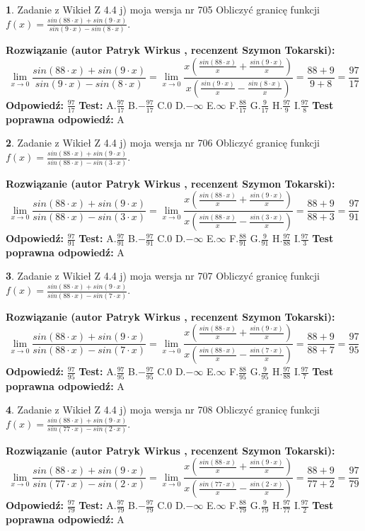 \documentclass[12pt, a4paper]{article}
\theoremstyle{definition} %
\newtheorem{zad}{}
\newcommand{\zadStart}[1]{\begin{zad}#1\newline}
\newcommand{\zadStop}{\end{zad}}
\newcommand{\rozwStart}[2]{\noindent \textbf{Rozwiązanie (autor #1 , recenzent #2): }\newline}
\newcommand{\rozwStop}{\newline}
\newcommand{\odpStart}{\noindent \textbf{Odpowiedź:}\newline}
\newcommand{\odpStop}{\newline}
\newcommand{\testStart}{\noindent \textbf{Test:}\newline}
\newcommand{\testStop}{\newline}
\newcommand{\kluczStart}{\noindent \textbf{Test poprawna odpowiedź:}\newline}
\newcommand{\kluczStop}{\newline}
\begin{document}
\zadStart{Zadanie z Wikieł Z 4.4 j) moja wersja nr 705}
Obliczyć granicę funkcji $f(x)=\frac{sin(88\cdot x) +sin(9\cdot x)}{sin(9\cdot x) -sin(8\cdot x)}$.
\zadStop
\rozwStart{Patryk Wirkus}{Szymon Tokarski}
$$\lim\limits_{x\to 0}\frac{sin(88\cdot x) +sin(9\cdot x)}{sin(9\cdot x) -sin(8\cdot x)}=\lim\limits_{x\to 0}\frac{x(\frac{sin(88\cdot x)}{x}+\frac{sin(9\cdot x)}{x})}{x(\frac{sin(9\cdot x)}{x}-\frac{sin(8\cdot x)}{x})}=\frac{88+9}{9+8} = \frac{97}{17}$$
\rozwStop
\odpStart
$\frac{97}{17}$
\odpStop
\testStart
A.$\frac{97}{17}$
B.$-\frac{97}{17}$
C.$0$
D.$-\infty$
E.$\infty$
F.$\frac{88}{17}$
G.$\frac{9}{17}$
H.$\frac{97}{9}$
I.$\frac{97}{8}$
\testStop
\kluczStart
A
\kluczStop



\zadStart{Zadanie z Wikieł Z 4.4 j) moja wersja nr 706}
Obliczyć granicę funkcji $f(x)=\frac{sin(88\cdot x) +sin(9\cdot x)}{sin(88\cdot x) -sin(3\cdot x)}$.
\zadStop
\rozwStart{Patryk Wirkus}{Szymon Tokarski}
$$\lim\limits_{x\to 0}\frac{sin(88\cdot x) +sin(9\cdot x)}{sin(88\cdot x) -sin(3\cdot x)}=\lim\limits_{x\to 0}\frac{x(\frac{sin(88\cdot x)}{x}+\frac{sin(9\cdot x)}{x})}{x(\frac{sin(88\cdot x)}{x}-\frac{sin(3\cdot x)}{x})}=\frac{88+9}{88+3} = \frac{97}{91}$$
\rozwStop
\odpStart
$\frac{97}{91}$
\odpStop
\testStart
A.$\frac{97}{91}$
B.$-\frac{97}{91}$
C.$0$
D.$-\infty$
E.$\infty$
F.$\frac{88}{91}$
G.$\frac{9}{91}$
H.$\frac{97}{88}$
I.$\frac{97}{3}$
\testStop
\kluczStart
A
\kluczStop



\zadStart{Zadanie z Wikieł Z 4.4 j) moja wersja nr 707}
Obliczyć granicę funkcji $f(x)=\frac{sin(88\cdot x) +sin(9\cdot x)}{sin(88\cdot x) -sin(7\cdot x)}$.
\zadStop
\rozwStart{Patryk Wirkus}{Szymon Tokarski}
$$\lim\limits_{x\to 0}\frac{sin(88\cdot x) +sin(9\cdot x)}{sin(88\cdot x) -sin(7\cdot x)}=\lim\limits_{x\to 0}\frac{x(\frac{sin(88\cdot x)}{x}+\frac{sin(9\cdot x)}{x})}{x(\frac{sin(88\cdot x)}{x}-\frac{sin(7\cdot x)}{x})}=\frac{88+9}{88+7} = \frac{97}{95}$$
\rozwStop
\odpStart
$\frac{97}{95}$
\odpStop
\testStart
A.$\frac{97}{95}$
B.$-\frac{97}{95}$
C.$0$
D.$-\infty$
E.$\infty$
F.$\frac{88}{95}$
G.$\frac{9}{95}$
H.$\frac{97}{88}$
I.$\frac{97}{7}$
\testStop
\kluczStart
A
\kluczStop



\zadStart{Zadanie z Wikieł Z 4.4 j) moja wersja nr 708}
Obliczyć granicę funkcji $f(x)=\frac{sin(88\cdot x) +sin(9\cdot x)}{sin(77\cdot x) -sin(2\cdot x)}$.
\zadStop
\rozwStart{Patryk Wirkus}{Szymon Tokarski}
$$\lim\limits_{x\to 0}\frac{sin(88\cdot x) +sin(9\cdot x)}{sin(77\cdot x) -sin(2\cdot x)}=\lim\limits_{x\to 0}\frac{x(\frac{sin(88\cdot x)}{x}+\frac{sin(9\cdot x)}{x})}{x(\frac{sin(77\cdot x)}{x}-\frac{sin(2\cdot x)}{x})}=\frac{88+9}{77+2} = \frac{97}{79}$$
\rozwStop
\odpStart
$\frac{97}{79}$
\odpStop
\testStart
A.$\frac{97}{79}$
B.$-\frac{97}{79}$
C.$0$
D.$-\infty$
E.$\infty$
F.$\frac{88}{79}$
G.$\frac{9}{79}$
H.$\frac{97}{77}$
I.$\frac{97}{2}$
\testStop
\kluczStart
A
\kluczStop
\end{document}
